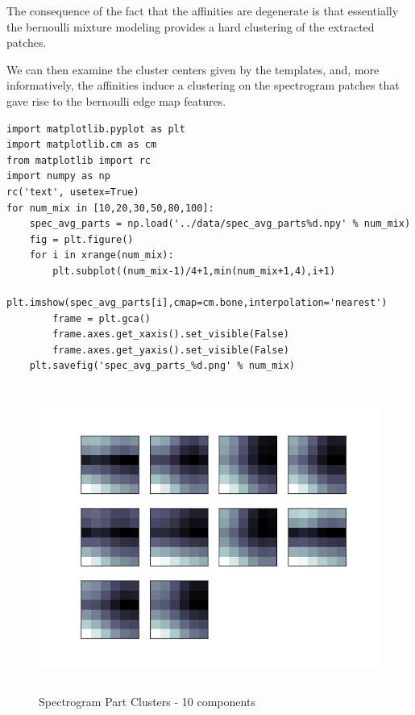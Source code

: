 \documentclass[11pt]{article}
\begin{document}
The consequence of the fact that the affinities are degenerate is that
essentially the bernoulli mixture modeling provides a hard clustering
of the extracted patches.

We can then examine the cluster centers given by the templates, and,
more informatively, the affinities induce a clustering on the spectrogram
patches that gave rise to the bernoulli edge map features.  


\begin{verbatim}
import matplotlib.pyplot as plt
import matplotlib.cm as cm
from matplotlib import rc
import numpy as np
rc('text', usetex=True)
for num_mix in [10,20,30,50,80,100]:
    spec_avg_parts = np.load('../data/spec_avg_parts%d.npy' % num_mix)
    fig = plt.figure()
    for i in xrange(num_mix):
        plt.subplot((num_mix-1)/4+1,min(num_mix+1,4),i+1)
        plt.imshow(spec_avg_parts[i],cmap=cm.bone,interpolation='nearest')
        frame = plt.gca()
        frame.axes.get_xaxis().set_visible(False)
        frame.axes.get_yaxis().set_visible(False)
    plt.savefig('spec_avg_parts_%d.png' % num_mix)
\end{verbatim}




\begin{figure}[htb]
\centering
\includegraphics[height=10cm]{./spec_avg_parts_10.png}
\caption{\label{fig:spec_avg_parts_10}Spectrogram Part Clusters - 10 components}
\end{figure}
\end{document}

